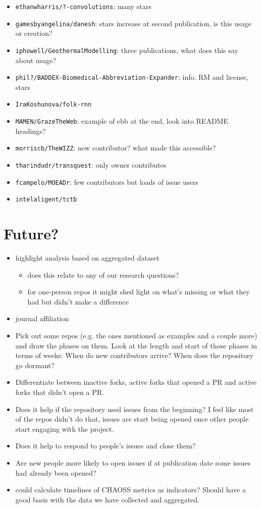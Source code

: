 \documentclass[10pt,a4paper]{scrartcl}
\begin{document}
\begin{itemize}
    \item \verb|ethanwharris/?-convolutions|: many stars
    \item \verb|gamesbyangelina/danesh|: stars increase at second publication, is this usage or creation?
    \item \verb|iphowell/GeothermalModelling|: three publications, what does this say about usage?
    \item \verb|phil?/BADDEX-Biomedical-Abbreviation-Expander|: info. RM and license, stars
    \item \verb|IraKoshunova/folk-rnn|
    \item \verb|MAMEN/GrazeTheWeb|: example of ebb at the end, look into README headings?
    \item \verb|morriscb/TheWIZZ|: new contributor? what made this accessible?
    \item \verb|tharindudr/transquest|: only owner contributes
    \item \verb|fcampelo/MOEADr|: few contributors but loads of issue users
    \item \verb|intelaligent/tctb|
\end{itemize}

\section{Future?}

\begin{itemize}
    \item highlight analysis based on aggregated dataset
    \begin{itemize}
        \item does this relate to any of our research questions?
        \item for one-person repos it might shed light on what's missing or what they had but didn't make a difference
    \end{itemize}
    \item journal affiliation
    \item Pick out some repos (e.g. the ones mentioned as examples and a couple more) and draw the phases on them. Look at the length and start of those phases in terms of weeks: When do new contributors arrive? When does the repository go dormant?
    \item Differentiate between inactive forks, active forks that opened a PR and active forks that didn't open a PR.
    \item Does it help if the repository used issues from the beginning? I feel like most of the repos didn't do that, issues are start being opened once other people start engaging with the project.
    \item Does it help to respond to people's issues and close them?
    \item Are new people more likely to open issues if at publication date some issues had already been opened?
    \item could calculate timelines of CHAOSS metrics as indicators? Should have a good basis with the data we have collected and aggregated.
\end{itemize}
\end{document}
